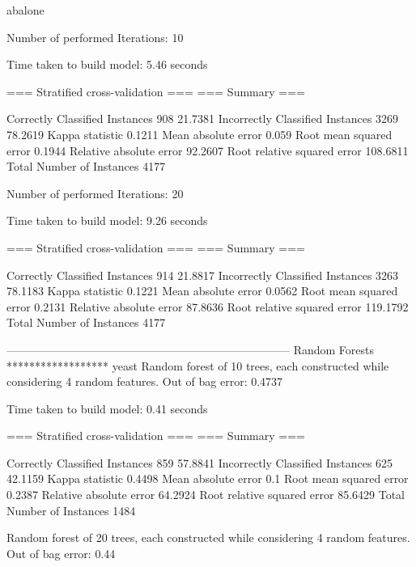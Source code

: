 abalone

Number of performed Iterations: 10


Time taken to build model: 5.46 seconds

=== Stratified cross-validation ===
=== Summary ===

Correctly Classified Instances         908               21.7381 %
Incorrectly Classified Instances      3269               78.2619 %
Kappa statistic                          0.1211
Mean absolute error                      0.059 
Root mean squared error                  0.1944
Relative absolute error                 92.2607 %
Root relative squared error            108.6811 %
Total Number of Instances             4177

Number of performed Iterations: 20


Time taken to build model: 9.26 seconds

=== Stratified cross-validation ===
=== Summary ===

Correctly Classified Instances         914               21.8817 %
Incorrectly Classified Instances      3263               78.1183 %
Kappa statistic                          0.1221
Mean absolute error                      0.0562
Root mean squared error                  0.2131
Relative absolute error                 87.8636 %
Root relative squared error            119.1792 %
Total Number of Instances             4177




--------------------------------------------------------------------------- Random Forests
****************** yeast
Random forest of 10 trees, each constructed while considering 4 random features.
Out of bag error: 0.4737



Time taken to build model: 0.41 seconds

=== Stratified cross-validation ===
=== Summary ===

Correctly Classified Instances         859               57.8841 %
Incorrectly Classified Instances       625               42.1159 %
Kappa statistic                          0.4498
Mean absolute error                      0.1   
Root mean squared error                  0.2387
Relative absolute error                 64.2924 %
Root relative squared error             85.6429 %
Total Number of Instances             1484     



Random forest of 20 trees, each constructed while considering 4 random features.
Out of bag error: 0.44



